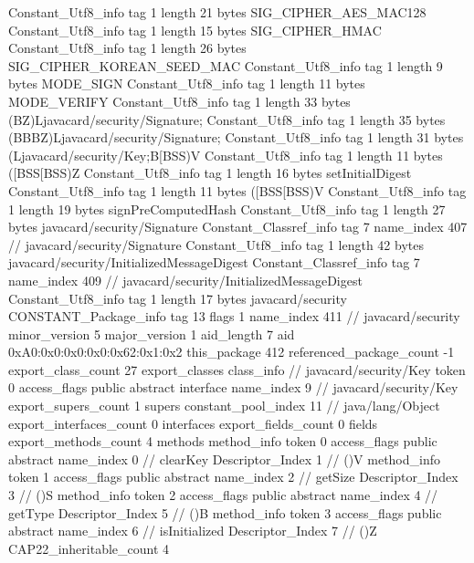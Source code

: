 {{{		}
		Constant_Utf8_info {
			tag	1
			length	21
			bytes	SIG_CIPHER_AES_MAC128
		}
		Constant_Utf8_info {
			tag	1
			length	15
			bytes	SIG_CIPHER_HMAC
		}
		Constant_Utf8_info {
			tag	1
			length	26
			bytes	SIG_CIPHER_KOREAN_SEED_MAC
		}
		Constant_Utf8_info {
			tag	1
			length	9
			bytes	MODE_SIGN
		}
		Constant_Utf8_info {
			tag	1
			length	11
			bytes	MODE_VERIFY
		}
		Constant_Utf8_info {
			tag	1
			length	33
			bytes	(BZ)Ljavacard/security/Signature;
		}
		Constant_Utf8_info {
			tag	1
			length	35
			bytes	(BBBZ)Ljavacard/security/Signature;
		}
		Constant_Utf8_info {
			tag	1
			length	31
			bytes	(Ljavacard/security/Key;B[BSS)V
		}
		Constant_Utf8_info {
			tag	1
			length	11
			bytes	([BSS[BSS)Z
		}
		Constant_Utf8_info {
			tag	1
			length	16
			bytes	setInitialDigest
		}
		Constant_Utf8_info {
			tag	1
			length	11
			bytes	([BSS[BSS)V
		}
		Constant_Utf8_info {
			tag	1
			length	19
			bytes	signPreComputedHash
		}
		Constant_Utf8_info {
			tag	1
			length	27
			bytes	javacard/security/Signature
		}
		Constant_Classref_info {
			tag	7
			name_index	407		// javacard/security/Signature
		}
		Constant_Utf8_info {
			tag	1
			length	42
			bytes	javacard/security/InitializedMessageDigest
		}
		Constant_Classref_info {
			tag	7
			name_index	409		// javacard/security/InitializedMessageDigest
		}
		Constant_Utf8_info {
			tag	1
			length	17
			bytes	javacard/security
		}
		CONSTANT_Package_info {
			tag	13
			flags	1
			name_index	411		// javacard/security
			minor_version	5
			major_version	1
			aid_length	7
			aid	0xA0:0x0:0x0:0x0:0x62:0x1:0x2
		}
	}
	this_package	412
	referenced_package_count	-1
	export_class_count	27
	export_classes {
		class_info {		// javacard/security/Key
			token	0
			access_flags	public abstract interface
			name_index	9		// javacard/security/Key
			export_supers_count	1
			supers {
				constant_pool_index	11		// java/lang/Object
			}
			export_interfaces_count	0
			interfaces {
			}
			export_fields_count	0
			fields {
			}
			export_methods_count	4
			methods {
				method_info {
					token	0
					access_flags	public abstract
					name_index	0		// clearKey
					Descriptor_Index	1		// ()V
				}
				method_info {
					token	1
					access_flags	public abstract
					name_index	2		// getSize
					Descriptor_Index	3		// ()S
				}
				method_info {
					token	2
					access_flags	public abstract
					name_index	4		// getType
					Descriptor_Index	5		// ()B
				}
				method_info {
					token	3
					access_flags	public abstract
					name_index	6		// isInitialized
					Descriptor_Index	7		// ()Z
				}
			}
			CAP22_inheritable_count	4
}}}
